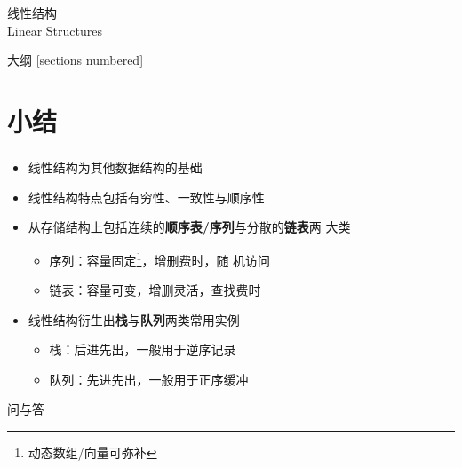 \begin{standout}[第一章]
    线性结构\\
    Linear Structures
\end{standout}

\begin{frame}{大纲}
    [sections numbered]
    \tableofcontents
\end{frame}





\section{小结}

\begin{frame}
    \frametitle{\insertsectionhead}
    \begin{itemize}
        \item 线性结构为其他数据结构的基础
        \item 线性结构特点包括\alert{有穷性}、\alert{一致性}与\alert{顺序性}
        \item 从存储结构上包括连续的\textbf{顺序表/序列}与分散的\textbf{链表}两
              大类
            \begin{itemize}
                \item 序列：容量固定\footnote{动态数组/向量可弥补}，增删费时，随
                      机访问
                \item 链表：容量可变，增删灵活，查找费时
            \end{itemize}
        \item 线性结构衍生出\textbf{栈}与\textbf{队列}两类常用实例
            \begin{itemize}
                \item 栈：后进先出，一般用于逆序记录
                \item 队列：先进先出，一般用于正序缓冲
            \end{itemize}
    \end{itemize}
\end{frame}

\begin{standout}[]
    问与答
\end{standout}